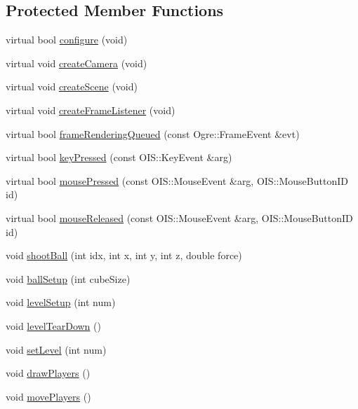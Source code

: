 \subsection*{Protected Member Functions}
\begin{DoxyCompactItemize}
\item 
virtual bool \hyperlink{classTileGame_a460265525565530c2d5d448a4f10cce1}{configure} (void)
\item 
virtual void \hyperlink{classTileGame_af68126fe7750735a9d3850f11cf93354}{create\-Camera} (void)
\item 
virtual void \hyperlink{classTileGame_a7a58cee3d3b0f06d80da0b06bae68347}{create\-Scene} (void)
\item 
virtual void \hyperlink{classTileGame_a8e62f0508c93131c11ed08e0adbedfbb}{create\-Frame\-Listener} (void)
\item 
virtual bool \hyperlink{classTileGame_abfa3b829a661de02f3f4bf2d8102bd49}{frame\-Rendering\-Queued} (const Ogre\-::\-Frame\-Event \&evt)
\item 
virtual bool \hyperlink{classTileGame_af96355c8ea5a968b5ceb5090ea4e811e}{key\-Pressed} (const O\-I\-S\-::\-Key\-Event \&arg)
\item 
virtual bool \hyperlink{classTileGame_a1826b5a7db94eb11037a46c5d57dfc4f}{mouse\-Pressed} (const O\-I\-S\-::\-Mouse\-Event \&arg, O\-I\-S\-::\-Mouse\-Button\-I\-D id)
\item 
virtual bool \hyperlink{classTileGame_ab7a0cbe5c9d1f41fa3b16486437511e4}{mouse\-Released} (const O\-I\-S\-::\-Mouse\-Event \&arg, O\-I\-S\-::\-Mouse\-Button\-I\-D id)
\item 
void \hyperlink{classTileGame_ab5fd23a93e7eb13a2664ba3275035adc}{shoot\-Ball} (int idx, int x, int y, int z, double force)
\item 
void \hyperlink{classTileGame_a512ac0031cfe85e79ca0a53582492240}{ball\-Setup} (int cube\-Size)
\item 
void \hyperlink{classTileGame_a1da6c5e8d396ebdfe05c2eedf28a2ca8}{level\-Setup} (int num)
\item 
void \hyperlink{classTileGame_a55045a99dda1545c4043ab6da75d2432}{level\-Tear\-Down} ()
\item 
void \hyperlink{classTileGame_ab59731a2c682beeda91ad1a89229a3f0}{set\-Level} (int num)
\item 
void \hyperlink{classTileGame_a32cb315499ee2a035e40a7d3d31cef7d}{draw\-Players} ()
\item 
void \hyperlink{classTileGame_aefafb6c06288a4decb2e13e3af183b9f}{move\-Players} ()

\end{DoxyCompactItemize}

